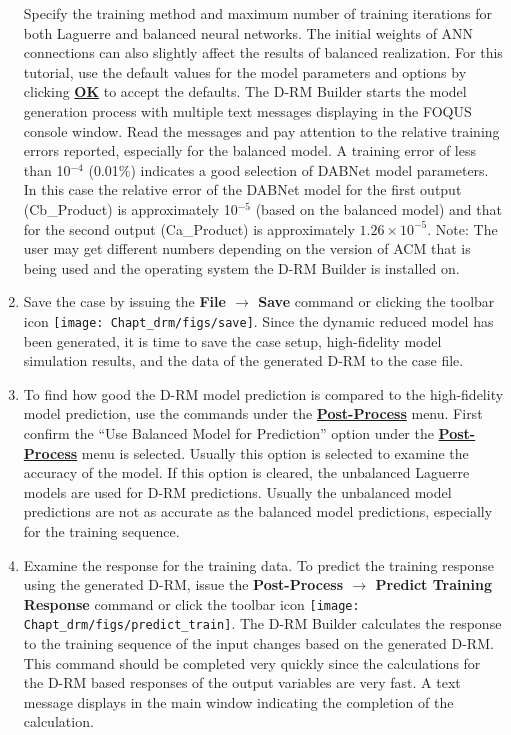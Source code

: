 \begin{enumerate}
Specify the training method and maximum number of training iterations for both Laguerre and balanced neural networks.  The initial weights of ANN connections can also slightly affect the results of balanced realization.  For this tutorial, use the default values for the model parameters and options by clicking \textbf{\underline{OK}} to accept the defaults.  The D-RM Builder starts the model generation process with multiple text messages displaying in the FOQUS console window.  Read the messages and pay attention to the relative training errors reported, especially for the balanced model.  A training error of less than 10$^{-4}$ (0.01\%) indicates a good selection of DABNet model parameters.  In this case the relative error of the DABNet model for the first output (Cb\_Product) is approximately 10$^{-5}$ (based on the balanced model) and that for the second output (Ca\_Product) is approximately $1.26\times10^{-5}$.  Note: The user may get different numbers depending on the version of ACM that is being used and the operating system the D-RM Builder is installed on.
	\item Save the case by issuing the \textbf{File $\rightarrow$ Save} command or clicking the toolbar icon \texttt{[image: Chapt\_drm/figs/save]}.  Since the dynamic reduced model has been generated, it is time to save the case setup, high-fidelity model simulation results, and the data of the generated D-RM to the case file.
	\item To find how good the D-RM model prediction is compared to the high-fidelity model prediction, use the commands under the \textbf{\underline{Post-Process}} menu.  First confirm the ``Use Balanced Model for Prediction'' option under the \textbf{\underline{Post-Process}} menu is selected.  Usually this option is selected to examine the accuracy of the model.  If this option is cleared, the unbalanced Laguerre models are used for D-RM predictions.  Usually the unbalanced model predictions are not as accurate as the balanced model predictions, especially for the training sequence. 
	\item Examine the response for the training data.  To predict the training response using the generated D-RM, issue the \textbf{Post-Process $\rightarrow$ Predict Training Response} command or click the toolbar icon \texttt{[image: Chapt\_drm/figs/predict\_train]}.  The D-RM Builder calculates the response to the training sequence of the input changes based on the generated D-RM.  This command should be completed very quickly since the calculations for the D-RM based responses of the output variables are very fast.  A text message displays in the main window indicating the completion of the calculation.

\end{enumerate}
